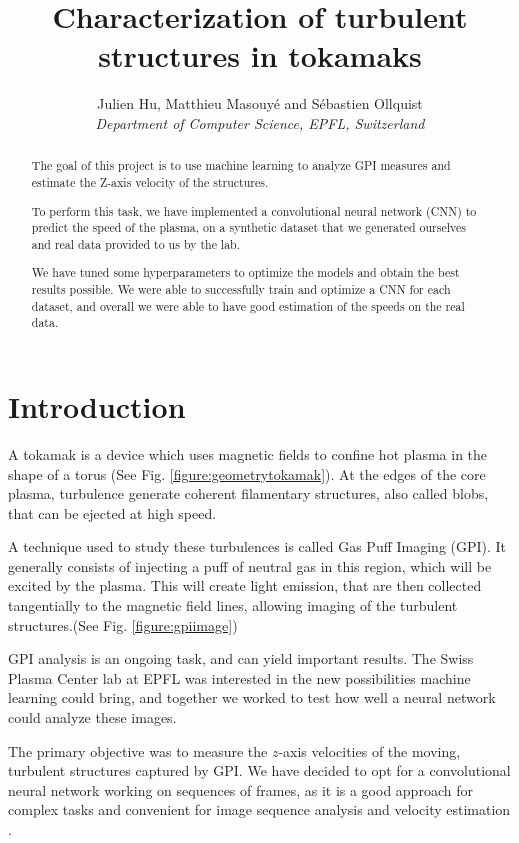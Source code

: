 \documentclass[10pt,conference]{IEEEtran}
\begin{document}
\title{Characterization of turbulent structures in tokamaks}

\author{
  Julien Hu, Matthieu Masouyé and Sébastien Ollquist\\
  \textit{Department of Computer Science, EPFL, Switzerland}
}

\maketitle
\thispagestyle{plain}
\pagestyle{plain}

\begin{abstract}
    The goal of this project is to use machine learning to analyze GPI measures and estimate the Z-axis velocity of the structures.\par 
    To perform this task, we have implemented a convolutional neural network (CNN) to predict the speed of the plasma, on a synthetic dataset that we generated ourselves and real data provided to us by the lab.\par
    We have tuned some hyperparameters to optimize the models and obtain the best results possible. We were able to successfully train and optimize a CNN for each dataset, and overall we were able to have good estimation of the speeds on the real data. 
\end{abstract}

\section{Introduction}
A tokamak is a device which uses magnetic fields to confine hot plasma in the shape of a torus\cite{wikipediatokamak} (See Fig. \ref{figure:geometrytokamak}). At the edges of the core plasma, turbulence generate coherent filamentary structures, also called blobs, that can be ejected at high speed.\par 
A technique used to study these turbulences is called Gas Puff Imaging (GPI). It generally consists of injecting a puff of neutral gas in this region, which will be excited by the plasma. This will create light emission, that are then collected tangentially to the magnetic field lines, allowing imaging of the turbulent structures.(See Fig. \ref{figure:gpiimage})\par

GPI analysis is an ongoing task, and can yield important results. The Swiss Plasma Center lab at EPFL was interested in the new possibilities machine learning could bring, and together we worked to test how well a neural network could analyze these images.\par
The primary objective was to measure the $z$-axis velocities of the moving, turbulent structures captured by GPI. We have decided to opt for a convolutional neural network working on sequences of frames, as it is a good approach for complex tasks and convenient for image sequence analysis and velocity estimation \cite{velocitycnn}.
\end{document}
